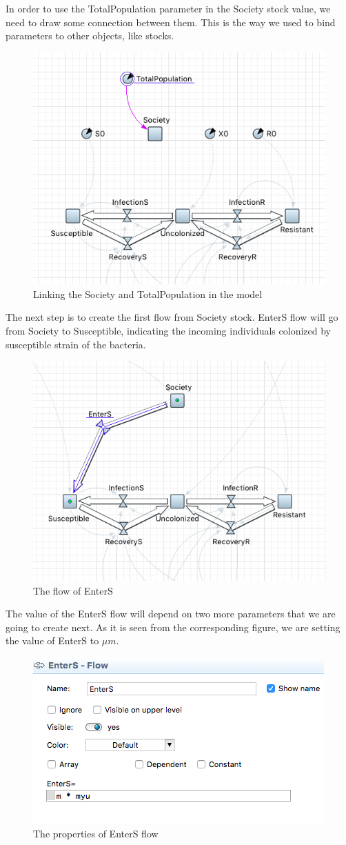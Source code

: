 In order to use the TotalPopulation parameter in the Society stock value, we need to draw some connection between them. This is the way we used to bind parameters to other objects, like stocks.

\begin{figure}[H]
  \centering
  \includegraphics[height=0.5\textwidth]{img/screens/society/society3}
  \caption{Linking the Society and TotalPopulation in the model}
\end{figure}

The next step is to create the first flow from Society stock. EnterS flow will go from Society to Susceptible, indicating the incoming individuals colonized by susceptible strain of the bacteria.

\begin{figure}[H]
  \centering
  \includegraphics[height=0.5\textwidth]{img/screens/society/society7}
  \caption{The flow of EnterS}
\end{figure}

The value of the EnterS flow will depend on two more parameters that we are going to create next. As it is seen from the corresponding figure, we are setting the value of EnterS to $\mu m$.

\begin{figure}[H]
  \centering
  \includegraphics[height=0.3\textwidth]{img/screens/society/society16}
  \caption{The properties of EnterS flow}
\end{figure}

